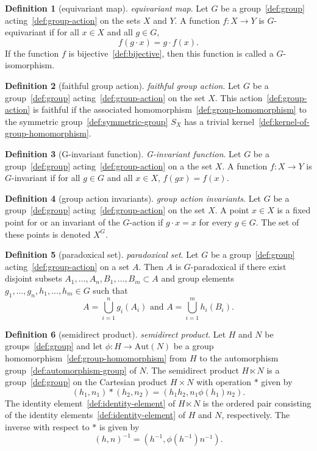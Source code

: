 \documentclass[12pt,a4paper]{article}
\theoremstyle{definition}
\newtheorem{definition}{Definition}
\begin{document}
\begin{definition}[equivariant map]\label{def:equivariant-map}
\emph{equivariant map}. Let $G$ be a group~\ref{def:group} acting~\ref{def:group-action} on the sets $X$ and $Y$. A function $f:X\to Y$ is $G$-equivariant if for all $x\in X$ and all $g\in G$, $$f(g\cdot x) = g\cdot f(x).$$ 
If the function $f$ is bijective~\ref{def:bijective}, then this function is called a $G$-isomorphism.
\end{definition}

\begin{definition}[faithful group action]\label{def:faithful-group-action}
\emph{faithful group action}. Let $G$ be a group~\ref{def:group} acting~\ref{def:group-action} on the set $X$. This action~\ref{def:group-action} is faithful if the associated homomorphism~\ref{def:group-homomorphism} to the symmetric group~\ref{def:symmetric-group} $S_X$ has a trivial kernel~\ref{def:kernel-of-group-homomorphism}.
\end{definition}

\begin{definition}[G-invariant function]\label{def:g-invariant-function}
\emph{G-invariant function}. Let $G$ be a group~\ref{def:group} acting~\ref{def:group-action} on a the set $X$. A function $f:X\to Y$ is $G$-invariant if for all $g\in G$ and all $x\in X$, $f(gx) = f(x)$.
\end{definition}

\begin{definition}[group action invariants]\label{def:group-action-invariants}
\emph{group action invariants}. Let $G$ be a group~\ref{def:group} acting~\ref{def:group-action} on the set $X$. A point $x\in X$ is a fixed point for or an invariant of the $G$-action if $g\cdot x=x$ for every $g\in G$. The set of these points is denoted $X^G$.
\end{definition}

\begin{definition}[paradoxical set]\label{def:paradoxical-set}
\emph{paradoxical set}. Let $G$ be a group~\ref{def:group} acting~\ref{def:group-action} on a set $A$. Then $A$ is $G$-paradoxical if there exist disjoint subsets $A_1,\dots, A_n, B_1,\dots, B_m\subset A$ and group elements $g_1,\dots,g_n,h_1,\dots,h_m\in G$ such that $$A=\bigcup_{i=1}^n g_i(A_i) \text{ and } A=\bigcup_{i=1}^m h_i(B_i).$$
\end{definition}

\begin{definition}[semidirect product]\label{def:semidirect-product}
\emph{semidirect product}. Let $H$ and $N$ be groups~\ref{def:group} and let $\phi: H\to \text{Aut}(N)$ be a group homomorphism~\ref{def:group-homomorphism} from $H$ to the automorphism group~\ref{def:automorphism-group} of $N$. The semidirect product $H\ltimes N$ is a group~\ref{def:group} on the Cartesian product $H\times N$ with operation $*$ given by $$(h_1,n_1)*(h_2,n_2) = (h_1h_2, n_1\phi(h_1)n_2).$$ The identity element~\ref{def:identity-element} of $H\ltimes N$ is the ordered pair consisting of the identity elements~\ref{def:identity-element} of $H$ and $N$, respectively. The inverse with respect to $*$ is given by $$(h,n)^{-1} = (h^{-1},\phi(h^{-1})n^{-1}).$$
\end{definition}
\end{document}
